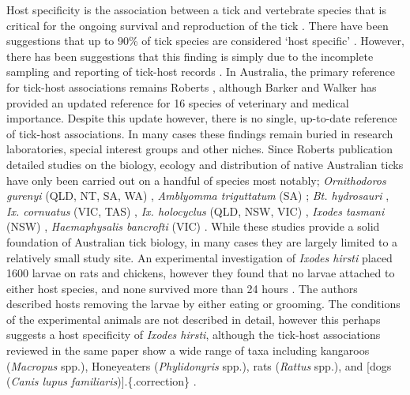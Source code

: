 \documentclass[a4paper, nobind]{templates/ociamthesis}
\begin{document}
Host specificity is the association between a tick and vertebrate species that is critical for the ongoing survival and reproduction of the tick \autocite{hoogstraalTickhostSpecificity1982}.
There have been suggestions that up to 90\% of tick species are considered `host specific' \autocite{hoogstraalTickhostSpecificity1982}.
However, there has been suggestions that this finding is simply due to the incomplete sampling and reporting of tick-host records \autocite{klompenEvolutionTicks1996}.
In Australia, the primary reference for tick-host associations remains Roberts \autocite*{robertsAustralianTicks1970}, although Barker and Walker \autocite*{barkerTicksAustraliaSpecies2014} has provided an updated reference for 16 species of veterinary and medical importance.
Despite this update however, there is no single, up-to-date reference of tick-host associations.
In many cases these findings remain buried in research laboratories, special interest groups and other niches.
Since Roberts \autocite*{robertsAustralianTicks1970} publication detailed studies on the biology, ecology and distribution of native Australian ticks have only been carried out on a handful of species most notably; \emph{Ornithodoros gurenyi} (QLD, NT, SA, WA) \autocite{doubeEcologyKangarooTick1972,doubeTwoRacesKangaroo1975}, \emph{Amblyomma triguttatum} (SA) \autocite{waudbySeasonalDensityFluctuations2007}; \emph{Bt. hydrosauri} \autocite{bullDispersalAustralianReptile1978,andrewsMatingBehaviourAustralian1980,belanHostDetectionFour1991,chiltonInterspecificDifferencesMicrohabitat1993}, \emph{Ix. cornuatus} (VIC, TAS) \autocite{jacksonGeneticVariationTicks2000,jacksonDistributionsParalysisTicks2007,songPhylogeneticPhylogeographicRelationships2011}, \emph{Ix. holocyclus} (QLD, NSW, VIC) \autocite{doubeSeasonalPatternsAbundance1979,jacksonGeneticVariationTicks2000,jacksonDistributionsParalysisTicks2007,songPhylogeneticPhylogeographicRelationships2011}, \emph{Ixodes tasmani} (NSW) \autocite{murdochEcologyCommonMarsupial2005}, \emph{Haemaphysalis bancrofti} (VIC) \autocite{laanOccuranceTickHaemaphysalis2011}.
While these studies provide a solid foundation of Australian tick biology, in many cases they are largely limited to a relatively small study site.
An experimental investigation of \emph{Ixodes hirsti} placed 1600 larvae on rats and chickens, however they found that no larvae attached to either host species, and none survived more than 24 hours \autocite{laanObservationsBiologyDistribution2011}.
The authors described hosts removing the larvae by either eating or grooming.
The conditions of the experimental animals are not described in detail, however this perhaps suggests a host specificity of \emph{Ixodes hirsti}, although the tick-host associations reviewed in the same paper show a wide range of taxa including kangaroos (\emph{Macropus} spp.), Honeyeaters (\emph{Phylidonyris} spp.), rats (\emph{Rattus} spp.), and {[}dogs (\emph{Canis lupus familiaris}){]}.\{.correction\} \autocite{laanObservationsBiologyDistribution2011}.
\end{document}
